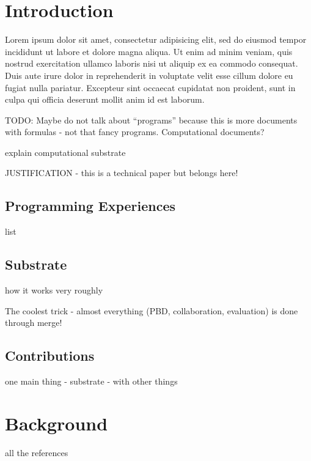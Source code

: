 \documentclass[sigconf]{acmart}
\begin{document}
\newpage

\section{Introduction}


Lorem ipsum dolor sit amet, consectetur adipisicing elit, sed do eiusmod tempor incididunt ut labore et dolore magna aliqua. Ut enim ad minim veniam, quis nostrud exercitation ullamco laboris nisi ut aliquip ex ea commodo consequat. Duis aute irure dolor in reprehenderit in voluptate velit esse cillum dolore eu fugiat nulla pariatur. Excepteur sint occaecat cupidatat non proident, sunt in culpa qui officia deserunt mollit anim id est laborum.

TODO: Maybe do not talk about ``programs'' because this is more documents with formulas - not that fancy programs.
Computational documents?

explain computational substrate

JUSTIFICATION - this is a technical paper but belongs here!

\subsection{Programming Experiences}
list

\subsection{Substrate}
how it works very roughly

The coolest trick - almost everything (PBD, collaboration, evaluation) is done through merge!

\subsection{Contributions}
one main thing - substrate - with other things


\section{Background}
all the references

\end{document}
